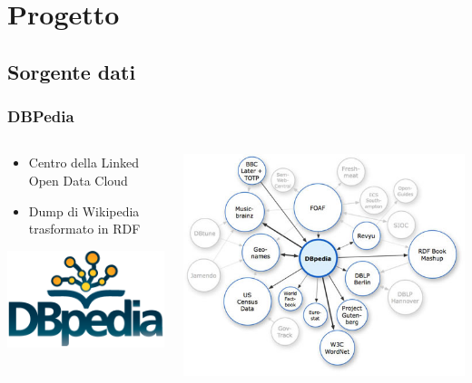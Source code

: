 \documentclass{beamer}
\begin{document}

\section{Progetto}

\subsection{Sorgente dati}

\begin{frame}
\frametitle{DBPedia}
\begin{columns}

\begin{column}{0.4\textwidth}
\begin{itemize}
\item Centro della Linked Open Data Cloud
\item Dump di Wikipedia trasformato in RDF
\end{itemize}
\vspace{1cm}
\centering\includegraphics[width=.8\textwidth]{figure/dbpedialogo}
\end{column}
\begin{column}{0.6\textwidth}
\includegraphics[width=1\textwidth]{figure/AboutDBPedia}
\end{column}
\end{columns}
\end{frame}
\end{document}
